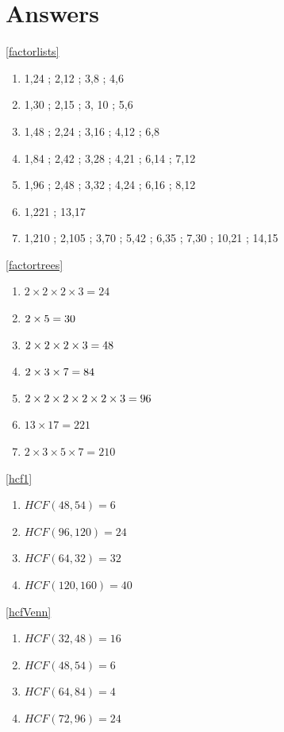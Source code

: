 \documentclass[a4paper,12pt]{article}
\begin{document}
\section{Answers}
\footnotesize
\ref{factorlists}
\begin{multicols}{4}
	\begin{enumerate}[label= \roman*)]
		\item 1,24 ; 2,12 ; 3,8 ; 4,6 
		\item 1,30 ; 2,15 ; 3, 10 ; 5,6 
		\item 1,48 ; 2,24 ; 3,16 ; 4,12 ; 6,8
		\item 1,84 ; 2,42 ; 3,28 ; 4,21 ; 6,14 ; 7,12  
		\item 1,96 ; 2,48 ; 3,32 ; 4,24 ; 6,16 ; 8,12
		\item 1,221 ; 13,17   
		\item 1,210 ; 2,105 ; 3,70 ; 5,42 ; 6,35 ; 7,30 ; 10,21 ; 14,15
	\end{enumerate}
\end{multicols}
\ref{factortrees}
\begin{multicols}{4}
	\begin{enumerate}[label= \roman*)]
		\item $2\times2\times2\times3=24$
		\item $2\time3\times5=30$ 
		\item $2\time2\times2\times2\times3=48$
		\item $2\time2\times3\times7=84$  
		\item $2\time2\times2\times2\times2\times2\times3=96$
		\item $13\times17=221$   
		\item $2\times3\times5\times7=210$
	\end{enumerate}
\end{multicols}
\ref{hcf1}
\begin{multicols}{4}
	\begin{enumerate}[label= \roman*)]
		\item $HCF(48,54)=6$
		\item $HCF(96,120)=24$ 
		\item $HCF(64,32)=32$
		\item $HCF(120,160)=40$  
	\end{enumerate}
\end{multicols}
\ref{hcfVenn}
\begin{multicols}{4}
	\begin{enumerate}[label= \roman*)]
		\item $HCF(32,48)=16$
		\item $HCF(48,54)=6$ 
		\item $HCF(64,84)=4$
		\item $HCF(72,96)=24$  
	\end{enumerate}
\end{multicols}
\end{document}
